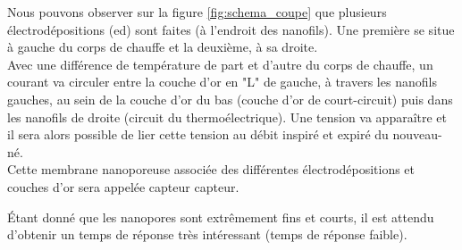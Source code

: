 Nous pouvons observer sur la figure \ref{fig:schema_coupe} que plusieurs électrodépositions (\gls{ed}) sont faites (à l'endroit des nanofils). Une première 
se situe à gauche du corps de chauffe et la deuxième, à sa droite. \\
Avec une différence de température de part et d'autre du corps de chauffe, un courant va circuler entre la couche d'or en "L" de gauche, à 
travers les nanofils gauches, au sein de la couche d'or du bas (couche d'or de court-circuit) puis dans les nanofils de droite (circuit du thermoélectrique). 
Une tension va apparaître et il sera alors possible de lier cette tension au débit inspiré et expiré du nouveau-né.\\
Cette membrane nanoporeuse associée des différentes électrodépositions et couches d'or sera appelée capteur \gls{capteur}. 

Étant donné que les nanopores sont extrêmement fins et courts, il est attendu d'obtenir un temps de réponse très intéressant (temps 
de réponse faible). 

\newpage
